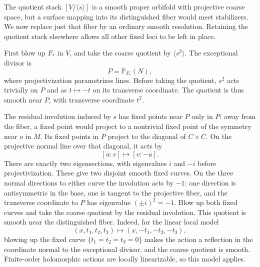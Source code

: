 \documentclass[11pt,reqno]{amsart}
\numberwithin{equation}{section}
\theoremstyle{definition}
\theoremstyle{remark}
\newcommand{\PP}{\mathbb P}
\begin{document}
The quotient stack $[V/\langle s\rangle]$ is a smooth proper orbifold
with projective coarse space, but a surface mapping into its distinguished
fiber would
meet stabilizers.  We now replace just that fiber by an ordinary
smooth resolution.  Retaining the quotient stack elsewhere allows
all other fixed loci to be left in place.

First blow up $F_*$ in $V$, and take the coarse quotient by
$\langle s^2\rangle$.  The exceptional divisor is
\begin{equation}\label{geo:P}
                          P=\PP_{F_*}(N),
\end{equation}
where projectivization parametrizes lines.  Before taking the quotient,
$s^2$ acts trivially on $P$ and as $t\mapsto-t$ on its transverse
coordinate.  The quotient is thus smooth near $P$, with transverse
coordinate $t^2$.

The residual involution induced by $s$ has fixed points near $P$ only
in $P$: away from the fiber, a fixed point would project to a
nontrivial fixed point of the symmetry near $o$ in $M$.  Its fixed
points in $P$ project to the diagonal of $C\times C$.  On the
projective normal line over that diagonal, it acts by
\[
                       [u:v]\longmapsto[v:-u].
\]
There are exactly two eigensections, with eigenvalues $i$ and $-i$
before projectivization.  These give two disjoint smooth fixed curves.
On the three normal directions to either curve the involution acts
by $-1$: one direction is antisymmetric in the base, one is tangent
to the projective fiber, and the transverse coordinate to $P$ has
eigenvalue $(\pm i)^2=-1$.  Blow up both fixed curves and take the
coarse quotient by the residual involution.  This quotient is smooth
near the distinguished fiber.  Indeed, for the linear local model
\[
              (x,t_1,t_2,t_3)\longmapsto(x,-t_1,-t_2,-t_3),
\]
blowing up the fixed curve $\{t_1=t_2=t_3=0\}$ makes the action a
reflection in the coordinate normal to the exceptional divisor, and
the coarse quotient is smooth.  Finite-order holomorphic actions are
locally linearizable, so this model applies.
\end{document}
